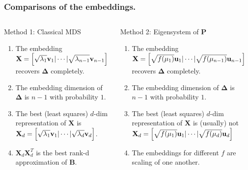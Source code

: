 \documentclass[professionalfonts,hyperref={pdfpagelabels=false,colorlinks=true,linkcolor=red}]{beamer}
\begin{document}
\begin{frame}
  \frametitle{Comparisons of the embeddings.}
  \begin{columns}[t]
  \begin{column}{0.46\textwidth}
    Method 1: Classical MDS
    \begin{enumerate}
    \item The embedding $\mathbf{X} = \Bigl[ \sqrt{\lambda_1} \mathbf{v}_1 |
        \cdots |
      \sqrt{\lambda_{n-1}} \mathbf{v}_{n-1} \Bigr]$ recovers
      $\bm{\Delta}$ completely.
    \item The embedding dimension of $\bm{\Delta}$
      is $n-1$ with probability $1$.
    \item The best (least squares) $d$-dim representation of
      $\mathbf{X}$ is $\mathbf{X}_d =  \Bigl[ \sqrt{\lambda_1} \mathbf{v}_1 |
       \cdots |
      \sqrt{\lambda_d} \mathbf{v}_{d} \Bigr]$.
        
    \item $\mathbf{X}_d \mathbf{X}_d^{T}$ is the best
      rank-d approximation of $\mathbf{B}$.
    \end{enumerate}
  \end{column}
  
  \begin{column}{0.54\textwidth}
    Method 2: Eigensystem of $\mathbf{P}$
    \begin{enumerate}
    \item The embedding 
      $\mathbf{X} = \Bigl[ \sqrt{f(\mu_1)} \mathbf{u}_1 |
       \cdots |
      \sqrt{f(\mu_{n-1})} \mathbf{u}_{n-1} \Bigr]$
      recovers 
      $\bm{\Delta}$ completely.
    \item The embedding dimension of $\bm{\Delta}$
      is $n-1$ with probability $1$.
    \item The best (least squares) $d$-dim representation of
      $\mathbf{X}$ is (usually) \alert{not}
      $\mathbf{X}_d = \Bigl[ \sqrt{f(\mu_1)} \mathbf{u}_1 |
       \cdots |
      \sqrt{f(\mu_d)} \mathbf{u}_d \Bigr]$
    \item The embeddings for \alert{different} $f$ are \alert{scaling} of one another.
    \end{enumerate}
  \end{column}
\end{columns}
\end{frame}
\end{document}
